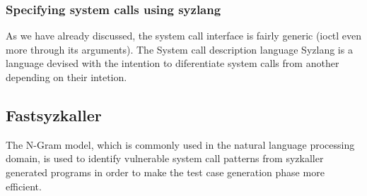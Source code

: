 \subsubsection{Specifying system calls using syzlang}

As we have already discussed, the system call interface is fairly generic
(ioctl even more through its arguments). The System call description language
Syzlang is a language devised with the intention to diferentiate system calls from
another depending on their intetion.






\subsection{Fastsyzkaller}

The N-Gram model, which is commonly used in the natural language processing domain,  is
used to identify vulnerable system call patterns from syzkaller generated programs in
order to make the test case generation phase more efficient.






